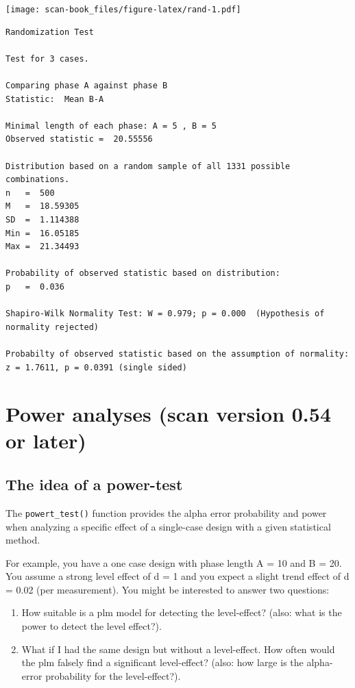 \documentclass[
]{book}
\providecommand{\tightlist}{%
  \setlength{\itemsep}{0pt}\setlength{\parskip}{0pt}}
\begin{document}
\texttt{[image: scan-book\_files/figure-latex/rand-1.pdf]}

\begin{verbatim}
Randomization Test

Test for 3 cases.

Comparing phase A against phase B 
Statistic:  Mean B-A 

Minimal length of each phase: A = 5 , B = 5 
Observed statistic =  20.55556 

Distribution based on a random sample of all 1331 possible combinations.
n   =  500 
M   =  18.59305 
SD  =  1.114388 
Min =  16.05185 
Max =  21.34493 

Probability of observed statistic based on distribution:
p   =  0.036 

Shapiro-Wilk Normality Test: W = 0.979; p = 0.000  (Hypothesis of normality rejected)

Probabilty of observed statistic based on the assumption of normality:
z = 1.7611, p = 0.0391 (single sided)
\end{verbatim}

\hypertarget{power-analyses-scan-version-0.54-or-later}{%
\chapter{Power analyses (scan version 0.54 or later)}\label{power-analyses-scan-version-0.54-or-later}}

\hypertarget{the-idea-of-a-power-test}{%
\section{The idea of a power-test}\label{the-idea-of-a-power-test}}

The \texttt{powert\_test()} function provides the alpha error probability and power when analyzing a specific effect of a single-case design with a given statistical method.

For example, you have a one case design with phase length A = 10 and B = 20. You assume a strong level effect of d = 1 and you expect a slight trend effect of d = 0.02 (per measurement). You might be interested to answer two questions:

\begin{enumerate}
\def\labelenumi{\arabic{enumi}.}
\tightlist
\item
  How suitable is a plm model for detecting the level-effect? (also: what is the power to detect the level effect?).
\item
  What if I had the same design but without a level-effect. How often would the plm falsely find a significant level-effect? (also: how large is the alpha-error probability for the level-effect?).
\end{enumerate}
\end{document}
